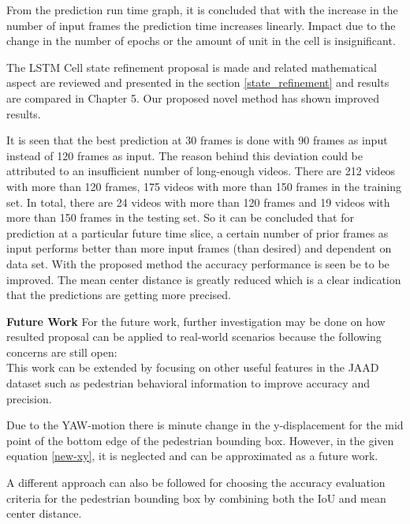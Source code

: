 From the prediction run time graph, it is concluded that with the increase in the number of input frames the prediction time increases linearly. Impact due to the change in the number of epochs or the amount of unit in the cell is insignificant.

The LSTM Cell state refinement proposal is made and related mathematical aspect are reviewed and presented in the section \ref{state_refinement} and results are compared in Chapter 5. Our proposed novel method has shown improved results. 

It is seen that the best prediction at 30 frames is done with 90 frames as input instead of 120 frames as input. The reason behind this deviation could be attributed to an insufficient number of long-enough videos. There are 212 videos with more than 120 frames, 175 videos with more than 150 frames in the training set. In total, there are 24 videos with more than 120 frames and 19 videos with more than 150 frames in the testing set. So it can be concluded that for prediction at a particular future time slice, a certain number of prior frames as input performs better than more input frames (than desired) and dependent on data set. With the proposed method the accuracy performance is seen be to be improved. The mean center distance is greatly reduced which is a clear indication that the predictions are getting more precised.

\newpara

\textbf{Future Work}
For the future work, further investigation may be done on how resulted proposal can be applied to real-world scenarios because the following concerns are still open: \\

This work can be extended by focusing on other useful features in the JAAD dataset such as pedestrian behavioral information to improve accuracy and precision.

Due to the YAW-motion there is minute change in the y-displacement for the mid point of the bottom edge of the pedestrian bounding box. However, in the given equation \ref{new-xy}, it is neglected and can be approximated as a future work.

A different approach can also be followed for choosing the accuracy evaluation criteria for the pedestrian bounding box by combining both the IoU and mean center distance.
